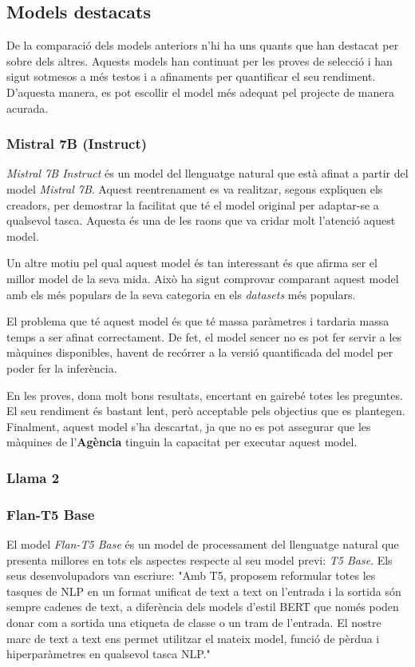 \subsection{Models destacats}
De la comparació dels models anteriors n'hi ha uns quants que han destacat per sobre dels altres. Aquests models han continuat per les proves de selecció i han sigut sotmesos a més testos i a afinaments per quantificar el seu rendiment. D'aquesta manera, es pot escollir el model més adequat pel projecte de manera acurada.

\subsubsection{Mistral 7B (Instruct)}
\textit{Mistral 7B Instruct} \cite{mistral} és un model del llenguatge natural que està afinat a partir del model \textit{Mistral 7B}. Aquest reentrenament es va realitzar, segons expliquen els creadors, per demostrar la facilitat que té el model original per adaptar-se a qualsevol tasca. Aquesta és una de les raons que va cridar molt l'atenció aquest model.

Un altre motiu pel qual aquest model és tan interessant és que afirma ser el millor model de la seva mida. Això ha sigut comprovar comparant aquest model amb els més populars de la seva categoria en els \textit{datasets} més populars.

El problema que té aquest model és que té massa paràmetres i tardaria massa temps a ser afinat correctament. De fet, el model sencer no es pot fer servir a les màquines disponibles, havent de recórrer a la versió quantificada del model per poder fer la inferència.

En les proves, dona molt bons resultats, encertant en gairebé totes les preguntes. El seu rendiment és bastant lent, però acceptable pels objectius que es plantegen. Finalment, aquest model s'ha descartat, ja que no es pot assegurar que les màquines de l'\textbf{Agència} tinguin la capacitat per executar aquest model.


\subsubsection{Llama 2}


\subsubsection{Flan-T5 Base}
El model \textit{Flan-T5 Base} \cite{flan-t5} és un model de processament del llenguatge natural que presenta millores en tots els aspectes respecte al seu model previ: \textit{T5 Base}. Els seus desenvolupadors van escriure: "Amb T5, proposem reformular totes les tasques de NLP en un format unificat de text a text on l'entrada i la sortida són sempre cadenes de text, a diferència dels models d'estil BERT que només poden donar com a sortida una etiqueta de classe o un tram de l'entrada. El nostre marc de text a text ens permet utilitzar el mateix model, funció de pèrdua i hiperparàmetres en qualsevol tasca NLP."

